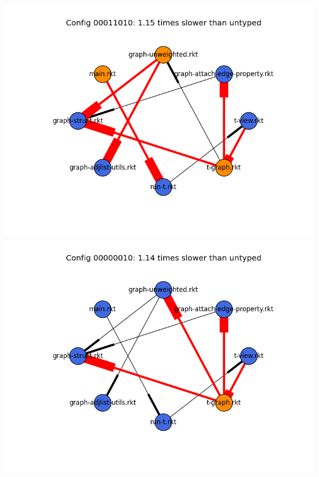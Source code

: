 \documentclass{article}
\begin{document}
\includegraphics[width=\textwidth]{mbta+graph-2015-04-20-module-graph-00011010.png}
\includegraphics[width=\textwidth]{mbta+graph-2015-04-20-module-graph-00000010.png}
\end{document}
